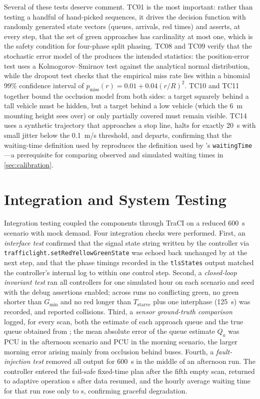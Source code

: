 Several of these tests deserve comment. TC01 is the most important: rather than testing a handful of hand-picked sequences, it drives the decision function with randomly generated state vectors (queues, arrivals, red times) and asserts, at every step, that the set of green approaches has cardinality at most one, which is the safety condition for four-phase split phasing. TC08 and TC09 verify that the stochastic error model of the \vls{} produces the intended statistics: the position-error test uses a Kolmogorov--Smirnov test against the analytical normal distribution, while the dropout test checks that the empirical miss rate lies within a binomial 99\% confidence interval of $p_{\text{miss}}(r) = 0.01 + 0.04(r/R)^2$. TC10 and TC11 together bound the occlusion model from both sides: a target squarely behind a tall vehicle must be hidden, but a target behind a low vehicle (which the 6~m mounting height sees over) or only partially covered must remain visible. TC14 uses a synthetic trajectory that approaches a stop line, halts for exactly 20~s with small jitter below the 0.1~m/s threshold, and departs, confirming that the waiting-time definition used by \dtx{} reproduces the definition used by \sumo{}'s \texttt{waitingTime}---a prerequisite for comparing observed and simulated waiting times in \cref{sec:calibration}.

\section{Integration and System Testing}\label{sec:integration}

Integration testing coupled the components through TraCI on a reduced 600~s scenario with mock demand. Four integration checks were performed. First, an \emph{interface test} confirmed that the signal state string written by the controller via \texttt{trafficlight.\allowbreak setRedYellowGreenState} was echoed back unchanged by \sumo{} at the next step, and that the phase timings recorded in the \sumo{} \texttt{tlsStates} output matched the controller's internal log to within one control step. Second, a \emph{closed-loop invariant test} ran all controllers for one simulated hour on each scenario and seed with the debug assertions enabled; across  runs no conflicting green, no green shorter than $G_{\min}$ and no red longer than $T_{\text{starve}}$ plus one interphase (125~s) was recorded, and \sumo{} reported  collisions. Third, a \emph{sensor ground-truth comparison} logged, for every scan, both the \vls{} estimate of each approach queue and the true queue obtained from \sumo{}; the mean absolute error of the queue estimate $Q_a$ was  PCU in the afternoon scenario and  PCU in the morning scenario, the larger morning error arising mainly from occlusion behind buses. Fourth, a \emph{fault-injection test} removed all \vls{} output for 600~s in the middle of an afternoon run. The controller entered the fail-safe fixed-time plan after the fifth empty scan, returned to adaptive operation  s after data resumed, and the hourly average waiting time for that run rose only to  s, confirming graceful degradation.

